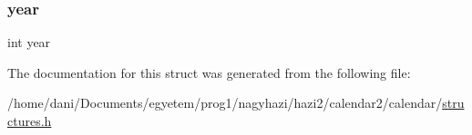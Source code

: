 \mbox{\label{struct_event_abeac221e38b7b9ce7df8722c842bf671}} 
\subsubsection{\texorpdfstring{year}{year}}
{\footnotesize\ttfamily int year}



The documentation for this struct was generated from the following file\+:\begin{DoxyCompactItemize}
\item 
/home/dani/\+Documents/egyetem/prog1/nagyhazi/hazi2/calendar2/calendar/\hyperlink{structures_8h}{structures.\+h}\end{DoxyCompactItemize}
